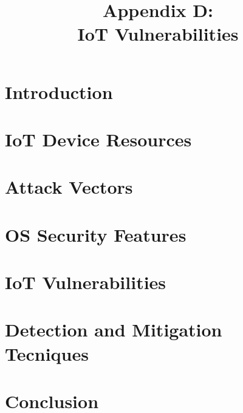 \documentclass[a4paper 12pt]{article}
\title{%
  Appendix D: \\
  \large IoT Vulnerabilities}
\date{}
\begin{document}
\setcounter{page}{1}
\renewcommand{\thepage}{D-\arabic{page}}
\maketitle
\section{Introduction}

\section{IoT Device Resources}

\section{Attack Vectors}

\section{OS Security Features}

\section{IoT Vulnerabilities}

\section{Detection and Mitigation Tecniques}

\section{Conclusion}
\clearpage
\printbibliography
\end{document}
